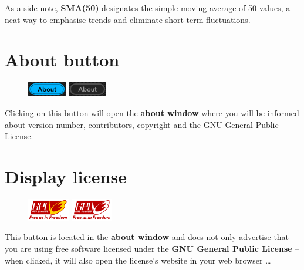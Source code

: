 As a side note, \textbf{SMA(50)} designates the simple moving average
of \num{50} values, a neat way to emphasise trends and eliminate
short-term fluctuations.

\section{About button}

\begin{figure}
\includegraphics[scale=\screenshotscale,clip]{include/images/button_about_on.png}
\newline \vspace{-0.9\baselineskip}
\includegraphics[scale=\screenshotscale,clip]{include/images/button_about_off.png}
\end{figure}

Clicking on this button will open the \textbf{about window} where you
will be informed about version number, contributors, copyright and the
GNU General Public License.

\section{Display license}

\begin{figure}
\includegraphics[scale=\screenshotscale,clip]{include/images/button_gpl_on.png}
\newline \vspace{-0.9\baselineskip}
\includegraphics[scale=\screenshotscale,clip]{include/images/button_gpl_off.png}
\end{figure}

This button is located in the \textbf{about window} and does not only
advertise that you are using free software licensed under the
\textbf{GNU General Public License} -- when clicked, it will also open
the license's website in your web browser \dots

